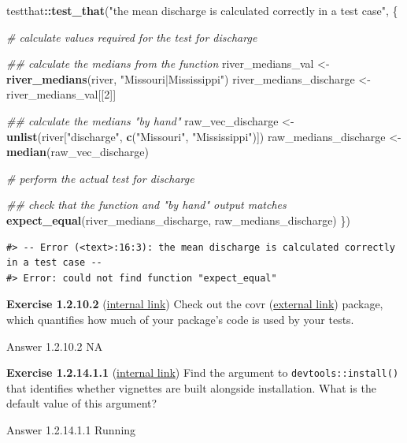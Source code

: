 \documentclass[
]{book}
\newenvironment{Shaded}{\begin{snugshade}}{\end{snugshade}}
\newcommand{\CommentTok}[1]{\textcolor[rgb]{0.56,0.35,0.01}{\textit{#1}}}
\newcommand{\DecValTok}[1]{\textcolor[rgb]{0.00,0.00,0.81}{#1}}
\newcommand{\KeywordTok}[1]{\textcolor[rgb]{0.13,0.29,0.53}{\textbf{#1}}}
\newcommand{\NormalTok}[1]{#1}
\newcommand{\OperatorTok}[1]{\textcolor[rgb]{0.81,0.36,0.00}{\textbf{#1}}}
\newcommand{\StringTok}[1]{\textcolor[rgb]{0.31,0.60,0.02}{#1}}
\begin{document}
\begin{Shaded}
\begin{Highlighting}[]
\NormalTok{testthat}\OperatorTok{::}\KeywordTok{test_that}\NormalTok{(}\StringTok{"the mean discharge is calculated correctly in a test case"}\NormalTok{, \{}
  
  \CommentTok{# calculate values required for the test for discharge}

  \CommentTok{## calculate the medians from the function}
\NormalTok{  river_medians_val <-}\StringTok{ }\KeywordTok{river_medians}\NormalTok{(river, }\StringTok{"Missouri|Mississippi"}\NormalTok{)}
\NormalTok{  river_medians_discharge <-}\StringTok{ }\NormalTok{river_medians_val[[}\DecValTok{2}\NormalTok{]]}

  \CommentTok{## calculate the medians "by hand"}
\NormalTok{  raw_vec_discharge <-}\StringTok{ }\KeywordTok{unlist}\NormalTok{(river[}\StringTok{"discharge"}\NormalTok{, }\KeywordTok{c}\NormalTok{(}\StringTok{"Missouri"}\NormalTok{, }\StringTok{"Mississippi"}\NormalTok{)])}
\NormalTok{  raw_medians_discharge <-}\StringTok{ }\KeywordTok{median}\NormalTok{(raw_vec_discharge)}
  
  \CommentTok{# perform the actual test for discharge}

  \CommentTok{## check that the function and "by hand" output matches}
  \KeywordTok{expect_equal}\NormalTok{(river_medians_discharge, raw_medians_discharge)}
\NormalTok{\})}
\end{Highlighting}
\end{Shaded}

\begin{verbatim}
#> -- Error (<text>:16:3): the mean discharge is calculated correctly in a test case --
#> Error: could not find function "expect_equal"
\end{verbatim}

\textbf{Exercise 1.2.10.2} (\protect\hyperlink{ex-set4}{internal link})
Check out the covr (\href{https://cran.r-project.org/web/packages/covr/vignettes/how_it_works.html}{external link}) package, which quantifies how much of your package's code is used by your tests.

Answer 1.2.10.2
NA

\textbf{Exercise 1.2.14.1.1} (\protect\hyperlink{ex-set5}{internal link})
Find the argument to \texttt{devtools::install()} that identifies whether vignettes are built alongside installation. What is the default value of this argument?

Answer 1.2.14.1.1
Running
\end{document}
